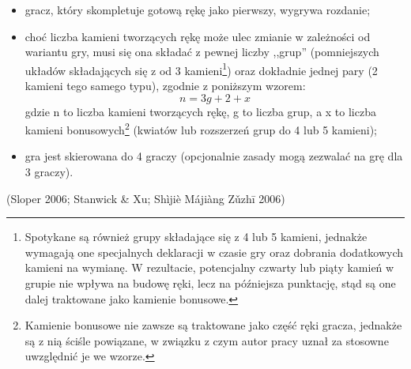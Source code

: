 \begin{enumerate}[label={\alph*)}]
\begin{itemize}
	  (手牌 );
	  \item gracz, który skompletuje gotową rękę jako pierwszy, wygrywa rozdanie;
	  \item choć liczba kamieni tworzących rękę może ulec zmianie w zależności od
	  wariantu gry, musi się ona składać z pewnej liczby ,,grup'' (pomniejszych
	  układów składających się z od 3 kamieni\footnote{Spotykane są również grupy
	  składające się z 4 lub 5 kamieni, jednakże wymagają one specjalnych
	  deklaracji w czasie gry oraz dobrania dodatkowych kamieni na wymianę. W
	  rezultacie, potencjalny czwarty lub piąty kamień w grupie nie wpływa na
	  budowę ręki, lecz na późniejsza punktację, stąd są one dalej traktowane
	  jako kamienie bonusowe.}) oraz dokładnie jednej pary (2 kamieni tego samego
	  typu), zgodnie z poniższym wzorem:
	  \begin{equation*}
	  n = 3g + 2 + x
	  \end{equation*}
	  gdzie n to liczba kamieni tworzących rękę, g to liczba grup, a x to liczba
	  kamieni bonusowych\footnote{Kamienie bonusowe nie zawsze są traktowane jako
	  część ręki gracza, jednakże są z nią ściśle powiązane, w związku z czym
	  autor pracy uznał za stosowne uwzględnić je we wzorze.} (kwiatów lub
	  rozszerzeń grup do 4 lub 5 kamieni);
	  \item gra jest skierowana do 4 graczy (opcjonalnie zasady mogą
	  zezwalać na grę dla 3 graczy).
	\end{itemize} 
\end{enumerate}
(Sloper 2006; Stanwick \& Xu; Shìjiè Májiàng Zǔzhī 2006)